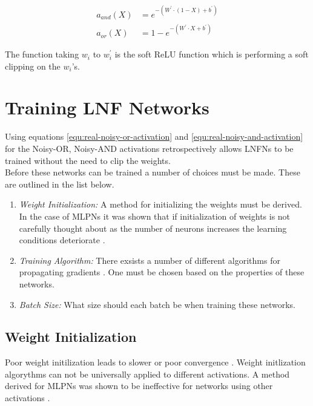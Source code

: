 \begin{align}
a_{and}(X) &= e^{-(W^{'} \cdot (1 - X) + b^{'})} \label{equ:real-noisy-and-activation}\\
a_{or}(X)&= 1 - e^{-(W^{'} \cdot X + b^{'})} \label{equ:real-noisy-or-activation}
\end{align}

The function taking $w_i$ to $w_i^{'}$ is the soft ReLU function which is performing a soft clipping on the $w_i$'s. 

\section{Training LNF Networks}
Using equations \ref{equ:real-noisy-or-activation} and \ref{equ:real-noisy-and-activation} for the Noisy-OR, Noisy-AND activations retrospectively allows LNFNs to be trained without the need to clip the weights.\\

Before these networks can be trained a number of choices must be made. These are outlined in the list below.

\begin{enumerate}
	\item \textit{Weight Initialization:} A method for initializing the weights must be derived. In the case of MLPNs it was shown that if initialization of weights is not carefully thought about as the number of neurons increases the learning conditions deteriorate \cite{glorot2010understanding}.
	\item \textit{Training Algorithm:} There exsists a number of different algorithms for propagating gradients \cite{ruder2016overview}. One must be chosen based on the properties of these networks.
	\item \textit{Batch Size:} What size should each batch be when training these networks.
\end{enumerate}

\subsection{Weight Initialization}
Poor weight initilization leads to slower or poor convergence \cite{mishkin2015all}. Weight initlization algorythms can not be universally applied to different activations. A method derived for MLPNs was shown to be ineffective for networks using other activations \cite{he2015delving}.


